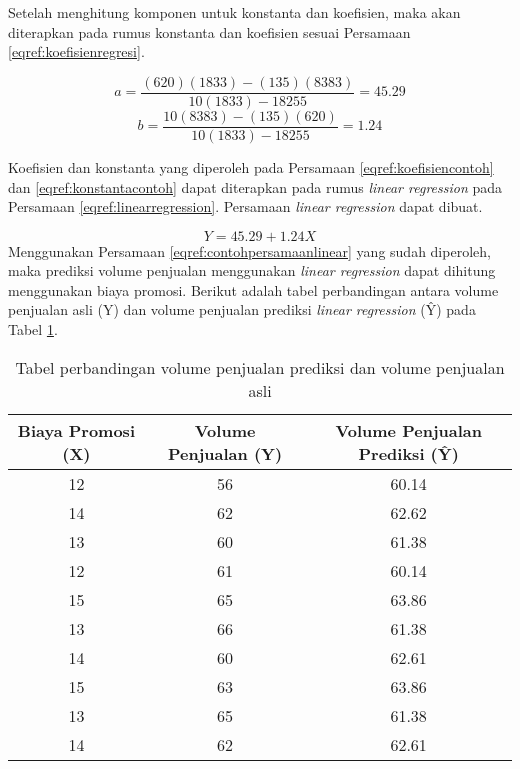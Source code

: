 Setelah menghitung komponen untuk konstanta dan koefisien, maka akan diterapkan pada rumus konstanta dan koefisien sesuai Persamaan \ref{eqref:koefisienregresi}.

\begin{equation}
 a = \frac{(620)(1833) - (135)(8383)}{10(1833) -18255 }  = 45.29
 \label{eqref:konstantacontoh}
\end{equation}
\begin{equation}
 b = \frac{10(8383) - (135)(620)}{10(1833) -18255 } = 1.24 
 \label{eqref:koefisiencontoh}
\end{equation}

Koefisien dan konstanta yang diperoleh pada Persamaan \ref{eqref:koefisiencontoh} dan \ref{eqref:konstantacontoh}  dapat diterapkan pada rumus \textit{linear regression} pada Persamaan \ref{eqref:linearregression}. Persamaan  \textit{linear regression} dapat dibuat.
 
\begin{equation}
  Y = 45.29 + 1.24X
  \label{eqref:contohpersamaanlinear}
\end{equation}
Menggunakan Persamaan \ref{eqref:contohpersamaanlinear} yang sudah diperoleh, maka prediksi volume penjualan menggunakan \textit{linear regression} dapat dihitung menggunakan biaya promosi. Berikut adalah tabel perbandingan antara volume penjualan asli (Y) dan volume penjualan prediksi \textit{linear regression} (\^{Y}) pada Tabel \ref{tab:perbandinganlinearregression}.



\begin{table}[H]
\caption{Tabel perbandingan volume penjualan prediksi dan volume penjualan asli}
\centering
\begin{tabular}{|c|c|c|}
\hline 
Biaya Promosi (X) & Volume Penjualan (Y) & Volume Penjualan Prediksi (\^{Y}) \\ 
\hline 
12 & 56 & 60.14 \\ 
\hline 
14 & 62 & 62.62 \\ 
\hline 
13 & 60 & 61.38 \\ 
\hline 
12 & 61 & 60.14 \\ 
\hline 
15 & 65 & 63.86 \\ 
\hline 
13 & 66 & 61.38 \\ 
\hline 
14 & 60 & 62.61 \\ 
\hline 
15 & 63 & 63.86 \\ 
\hline 
13 & 65 & 61.38 \\ 
\hline 
14 & 62 & 62.61 \\ 
\hline 
\end{tabular} 
\label{tab:perbandinganlinearregression}
\end{table}

